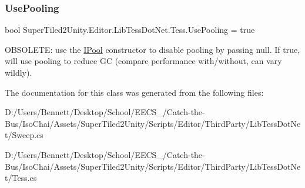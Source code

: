\subsubsection{\texorpdfstring{Use\+Pooling}{UsePooling}}
{\footnotesize\ttfamily bool Super\+Tiled2\+Unity.\+Editor.\+Lib\+Tess\+Dot\+Net.\+Tess.\+Use\+Pooling = true}



O\+B\+S\+O\+L\+E\+TE\+: use the \mbox{\hyperlink{class_super_tiled2_unity_1_1_editor_1_1_lib_tess_dot_net_1_1_i_pool}{I\+Pool}} constructor to disable pooling by passing null. If true, will use pooling to reduce GC (compare performance with/without, can vary wildly). 



The documentation for this class was generated from the following files\+:\begin{DoxyCompactItemize}
\item 
D\+:/\+Users/\+Bennett/\+Desktop/\+School/\+E\+E\+C\+S\+\_/\+Catch-\/the-\/\+Bus/\+Iso\+Chai/\+Assets/\+Super\+Tiled2\+Unity/\+Scripts/\+Editor/\+Third\+Party/\+Lib\+Tess\+Dot\+Net/Sweep.\+cs\item 
D\+:/\+Users/\+Bennett/\+Desktop/\+School/\+E\+E\+C\+S\+\_/\+Catch-\/the-\/\+Bus/\+Iso\+Chai/\+Assets/\+Super\+Tiled2\+Unity/\+Scripts/\+Editor/\+Third\+Party/\+Lib\+Tess\+Dot\+Net/Tess.\+cs\end{DoxyCompactItemize}
